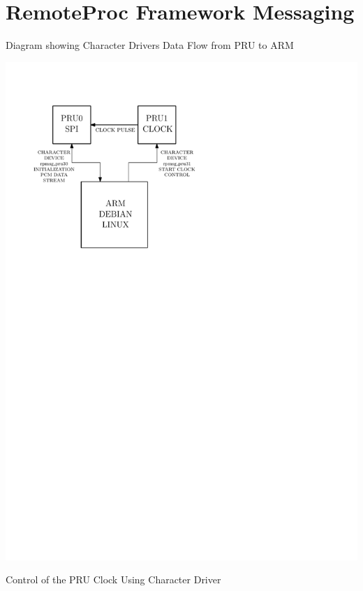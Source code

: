 \chapter{RemoteProc Framework Messaging}


Diagram showing Character Drivers
Data Flow from PRU to ARM

\includegraphics{diagrams/char_devices_2}

Control of the PRU Clock Using Character Driver

